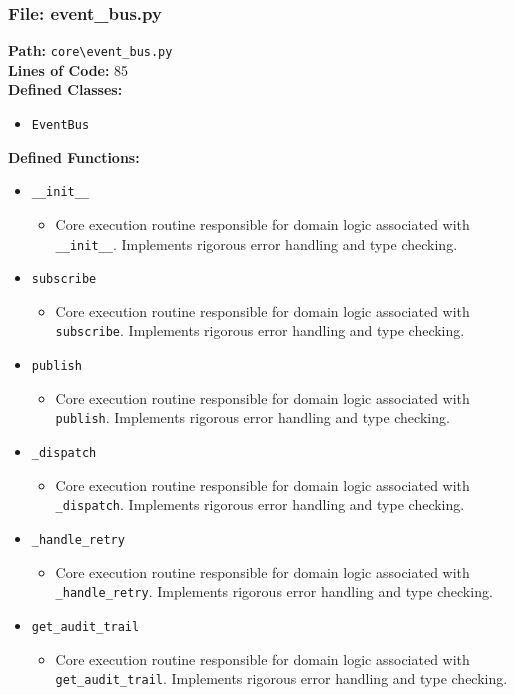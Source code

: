 \documentclass[10pt,journal,compsoc]{IEEEtran}
\begin{document}
\subsubsection{File: event\_bus.py}
\textbf{Path:} \texttt{core\textbackslash{}event\_bus.py} \\
\textbf{Lines of Code:} 85 \\
\textbf{Defined Classes:}
\begin{itemize}
    \item \texttt{EventBus}
\end{itemize}
\textbf{Defined Functions:}
\begin{itemize}
    \item \texttt{\_\_init\_\_}
    \begin{itemize} \item Core execution routine responsible for domain logic associated with \texttt{\_\_init\_\_}. Implements rigorous error handling and type checking. \end{itemize}
    \item \texttt{subscribe}
    \begin{itemize} \item Core execution routine responsible for domain logic associated with \texttt{subscribe}. Implements rigorous error handling and type checking. \end{itemize}
    \item \texttt{publish}
    \begin{itemize} \item Core execution routine responsible for domain logic associated with \texttt{publish}. Implements rigorous error handling and type checking. \end{itemize}
    \item \texttt{\_dispatch}
    \begin{itemize} \item Core execution routine responsible for domain logic associated with \texttt{\_dispatch}. Implements rigorous error handling and type checking. \end{itemize}
    \item \texttt{\_handle\_retry}
    \begin{itemize} \item Core execution routine responsible for domain logic associated with \texttt{\_handle\_retry}. Implements rigorous error handling and type checking. \end{itemize}
    \item \texttt{get\_audit\_trail}
    \begin{itemize} \item Core execution routine responsible for domain logic associated with \texttt{get\_audit\_trail}. Implements rigorous error handling and type checking. \end{itemize}
\end{itemize}
\end{document}
